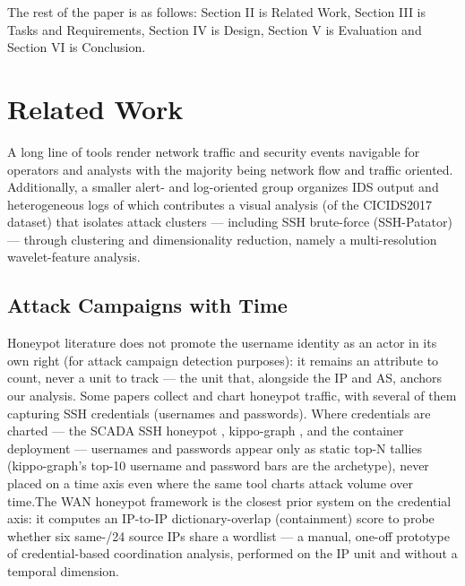\documentclass[10pt,twocolumn]{article}   %
\begin{document}
The rest of the paper is as follows: Section II is Related Work, Section III is Tasks and Requirements, Section IV is Design, Section V is Evaluation and 
Section VI is Conclusion.

\section{Related Work}

A long line of tools \cite{mansmann2006interactive, oberheide2006flamingo, mansmann2009visual, taylor2009flovis, chen2014oceans, tremel2022vitalflow, xiao2006enhancing, goodall2009viassist} render network traffic and security events navigable for operators and analysts with the majority being network flow 
and traffic oriented. Additionally, a smaller alert- and log-oriented group \cite{livnat2005visual, king2014coordinated, jeong2023multi, jeong2022interactive, ceneda2016routingwatch,
roberts2007state, yi2008understanding, choi2009fast, humphries2013elvis, yu2010ember}
organizes IDS output and heterogeneous logs of which
\cite{jeong2023multi} contributes a visual analysis (of the CICIDS2017 dataset) that isolates attack clusters — including SSH brute-force (SSH-Patator) — through clustering and 
dimensionality reduction, namely a multi-resolution wavelet-feature analysis.


\subsection{Attack Campaigns with Time}

Honeypot literature does not promote the username identity as an actor in its own right (for attack campaign detection purposes): it remains an attribute to count, never a 
unit to track — the unit that, alongside the IP and AS, anchors our analysis. Some papers \cite{djap2021xb, visoottiviseth2011distributed, baykara2018novel, belqruch2019scada,
koniaris2013analysis, kyriakou2018container, koniaris2014honeypots} collect and chart honeypot traffic, with several of them 
capturing SSH credentials (usernames and passwords). Where credentials are charted — the SCADA SSH honeypot \cite{belqruch2019scada}, kippo-graph \cite{koniaris2013analysis}, 
and the container deployment \cite{kyriakou2018container} — 
usernames and passwords  appear only as static top-N tallies (kippo-graph's top-10  username and password bars are the archetype), never placed on a time axis even where 
the same tool charts attack volume over time.The WAN honeypot framework \cite{fraunholz2017distributed} is the closest prior system on the credential axis: it computes an IP-to-IP dictionary-overlap 
(containment) score to probe whether six same-/24 source IPs share a wordlist — a manual, one-off prototype of credential-based coordination analysis, performed on the 
IP unit and without a temporal dimension. 
\end{document}
